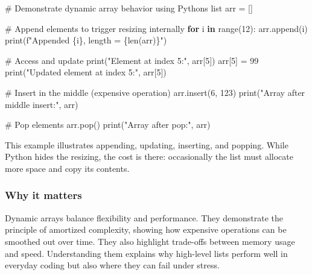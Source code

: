 \documentclass[
  letterpaper,
  DIV=11,
  numbers=noendperiod]{scrreprt}
\newenvironment{Shaded}{\begin{snugshade}}{\end{snugshade}}
\newcommand{\BuiltInTok}[1]{\textcolor[rgb]{0.00,0.23,0.31}{#1}}
\newcommand{\CommentTok}[1]{\textcolor[rgb]{0.37,0.37,0.37}{#1}}
\newcommand{\ControlFlowTok}[1]{\textcolor[rgb]{0.00,0.23,0.31}{\textbf{#1}}}
\newcommand{\DecValTok}[1]{\textcolor[rgb]{0.68,0.00,0.00}{#1}}
\newcommand{\KeywordTok}[1]{\textcolor[rgb]{0.00,0.23,0.31}{\textbf{#1}}}
\newcommand{\NormalTok}[1]{\textcolor[rgb]{0.00,0.23,0.31}{#1}}
\newcommand{\OperatorTok}[1]{\textcolor[rgb]{0.37,0.37,0.37}{#1}}
\newcommand{\SpecialCharTok}[1]{\textcolor[rgb]{0.37,0.37,0.37}{#1}}
\newcommand{\SpecialStringTok}[1]{\textcolor[rgb]{0.13,0.47,0.30}{#1}}
\newcommand{\StringTok}[1]{\textcolor[rgb]{0.13,0.47,0.30}{#1}}
\begin{document}
\begin{Shaded}
\begin{Highlighting}[]
\CommentTok{\# Demonstrate dynamic array behavior using Python\textquotesingle{}s list}
\NormalTok{arr }\OperatorTok{=}\NormalTok{ []}

\CommentTok{\# Append elements to trigger resizing internally}
\ControlFlowTok{for}\NormalTok{ i }\KeywordTok{in} \BuiltInTok{range}\NormalTok{(}\DecValTok{12}\NormalTok{):}
\NormalTok{    arr.append(i)}
    \BuiltInTok{print}\NormalTok{(}\SpecialStringTok{f"Appended }\SpecialCharTok{\{}\NormalTok{i}\SpecialCharTok{\}}\SpecialStringTok{, length = }\SpecialCharTok{\{}\BuiltInTok{len}\NormalTok{(arr)}\SpecialCharTok{\}}\SpecialStringTok{"}\NormalTok{)}

\CommentTok{\# Access and update}
\BuiltInTok{print}\NormalTok{(}\StringTok{"Element at index 5:"}\NormalTok{, arr[}\DecValTok{5}\NormalTok{])}
\NormalTok{arr[}\DecValTok{5}\NormalTok{] }\OperatorTok{=} \DecValTok{99}
\BuiltInTok{print}\NormalTok{(}\StringTok{"Updated element at index 5:"}\NormalTok{, arr[}\DecValTok{5}\NormalTok{])}

\CommentTok{\# Insert in the middle (expensive operation)}
\NormalTok{arr.insert(}\DecValTok{6}\NormalTok{, }\DecValTok{123}\NormalTok{)}
\BuiltInTok{print}\NormalTok{(}\StringTok{"Array after middle insert:"}\NormalTok{, arr)}

\CommentTok{\# Pop elements}
\NormalTok{arr.pop()}
\BuiltInTok{print}\NormalTok{(}\StringTok{"Array after pop:"}\NormalTok{, arr)}
\end{Highlighting}
\end{Shaded}

This example illustrates appending, updating, inserting, and popping.
While Python hides the resizing, the cost is there: occasionally the
list must allocate more space and copy its contents.

\subsubsection{Why it matters}\label{why-it-matters-16}

Dynamic arrays balance flexibility and performance. They demonstrate the
principle of amortized complexity, showing how expensive operations can
be smoothed out over time. They also highlight trade-offs between memory
usage and speed. Understanding them explains why high-level lists
perform well in everyday coding but also where they can fail under
stress.
\end{document}
